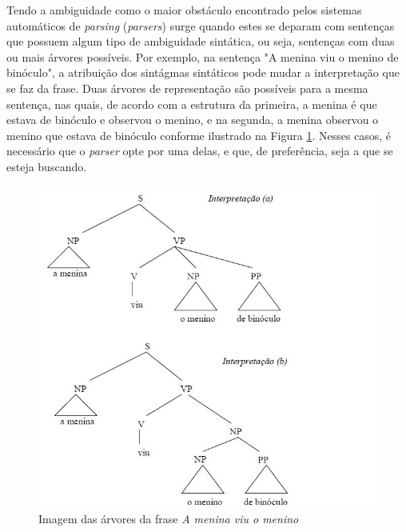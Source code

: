 Tendo a ambiguidade como o maior obstáculo encontrado pelos sistemas automáticos de \emph{parsing} (\emph{parsers}) surge quando estes se deparam com sentenças que possuem algum tipo de ambiguidade sintática, ou seja, sentenças com duas ou mais árvores possíveis. Por exemplo, na sentença "A menina viu o menino de binóculo", a atribuição dos sintágmas sintáticos pode mudar a interpretação que se faz da frase. Duas árvores de representação são possíveis para a mesma sentença, nas quais, de acordo com a estrutura da primeira, a menina é que estava de binóculo e observou o menino, e na segunda, a menina observou o menino que estava de binóculo conforme ilustrado na Figura \ref{ambiguidade}. Nesses casos, é necessário que o \emph{parser} opte por uma delas, e que, de preferência, seja a que se esteja buscando.




\begin{figure}
	\begin{center}
		\includegraphics[scale=0.5]{ambig.jpg}
		\caption{\label{ambiguidade} Imagem das árvores da frase \emph{A menina viu o menino}}		
	\end{center}
\end{figure}



